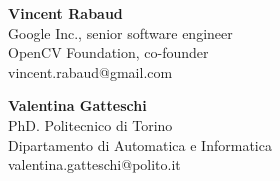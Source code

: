 \textbf{Vincent Rabaud}\\
Google Inc., senior software engineer\\
OpenCV Foundation, co-founder\\
vincent.rabaud@gmail.com

\textbf{Valentina Gatteschi}\\
PhD. Politecnico di Torino\\
Dipartamento di Automatica e Informatica\\
valentina.gatteschi@polito.it
